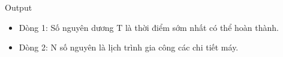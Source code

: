 Output
\begin{itemize}
	\item     Dòng 1: Số nguyên dương T là thời điểm sớm nhất có thể hoàn thành.   
	\item     Dòng 2: N số nguyên là lịch trình gia công các chi tiết máy.   
\end{itemize}